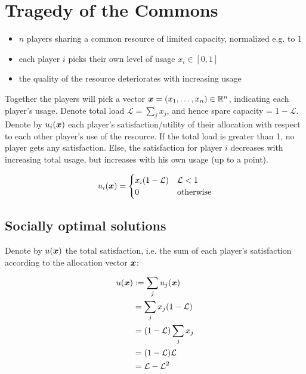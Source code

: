 \section{Tragedy of the Commons}

\begin{itemize}
	\itemsep0em
	\item $n$ players sharing a common resource of limited capacity, normalized e.g. to 1
	\item each player $i$ picks their own level of usage $x_i \in [0,1]$
	\item the quality of the resource deteriorates with increasing usage
\end{itemize}

Together the players will pick a vector $\bm{x} = (x_1, \ldots, x_n) \in
\mathbb{R}^n$, indicating each player's usage.  Denote total load $\mathcal{L}
= \sum_j x_j$, and hence spare capacity = $1 - \mathcal{L}$. \\

Denote by $u_i(\bm{x})$ each player's satisfaction/utility of their
allocation with respect to each other player's use of the resource.  If the
total load is greater than 1, no player gets any satisfaction. Else, the
satisfaction for player $i$ decreases with increasing total usage, but
increases with his own usage (up to a point).

\begin{equation}
	u_i(\bm{x}) = 
	\begin{cases}
		x_i (1 - \mathcal{L}) & \mathcal{L} < 1 \\
		0 & \text{otherwise}
	\end{cases}
\end{equation}

\subsection{Socially optimal solutions}

Denote by $u(\bm{x})$ the total satisfaction, i.e. the sum of each player's
satisfaction according to the allocation vector $\bm{x}$:

\begin{equation}
	\begin{split}
		u(\bm{x}) & := \sum_j u_j(\bm{x}) \\
		& = \sum_j x_j (1 - \mathcal{L}) \\
		& = (1 - \mathcal{L}) \sum_j x_j \\
		& = (1 - \mathcal{L}) \mathcal{L} \\
		& = \mathcal{L} - \mathcal{L}^2
	\end{split}
\end{equation}

